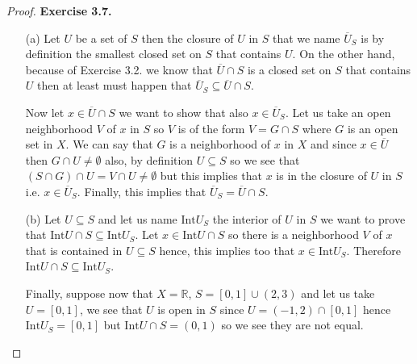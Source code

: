 \documentclass[11pt]{article}
\newcommand{\R}{\mathbb{R}}
\newcommand{\inter}{\text{Int}}
\theoremstyle{definition}
\begin{document}
\begin{proof}{\textbf{Exercise 3.7.}}
    \begin{itemize}
        \item [(a)] Let $U$ be a set of $S$ then the closure of $U$ in $S$ that
        we name $\overline{U}_S$ is by definition the smallest closed set on $S$ that
        contains $U$.
        On the other hand, because of Exercise 3.2. we know that
        $\overline{U} \cap S$ is a closed set on $S$ that contains $U$       
        then at least must happen that
        $\overline{U}_S \subseteq \overline{U} \cap S$.

        Now let $x \in \overline{U} \cap S$ we want to show that also
        $x \in \overline{U}_S$. Let us take an open neighborhood $V$
        of $x$ in $S$ so $V$ is of the form $V = G \cap S$ where $G$ is an
        open set in $X$. We can say that $G$ is a neighborhood of $x$ in $X$
        and since $x \in \overline{U}$ then $G \cap U \neq \emptyset$ 
        also, by definition $U \subseteq S$ so we see that
        $(S \cap G) \cap U = V \cap U \neq \emptyset$ but this implies that
        $x$ is in the closure of $U$ in $S$ i.e. $x \in \overline{U}_S$.
        Finally, this implies that $\overline{U}_S = \overline{U} \cap S$.

        \item [(b)] Let $U \subseteq S$ and let us name $\inter U_S$
        the interior of $U$ in $S$ we want to prove that
        $\inter U \cap S \subseteq \inter U_S$. Let $x \in \inter U \cap S$
        so there is a neighborhood $V$ of $x$ that is contained in
        $U \subseteq S$ hence, this implies too that $x \in \inter U_S$.
        Therefore $\inter U \cap S \subseteq \inter U_S$.

        Finally, suppose now that $X = \R$, $S = [0,1] \cup (2,3)$
        and let us take $U = [0,1]$, we see that $U$ is open in $S$ since
        $U = (-1, 2) \cap [0,1]$ hence $\inter U_S = [0,1]$ but 
        $\inter U \cap S = (0,1)$ so we see they are not equal. 
    \end{itemize}    
\end{proof}
\cleardoublepage
\end{document}
